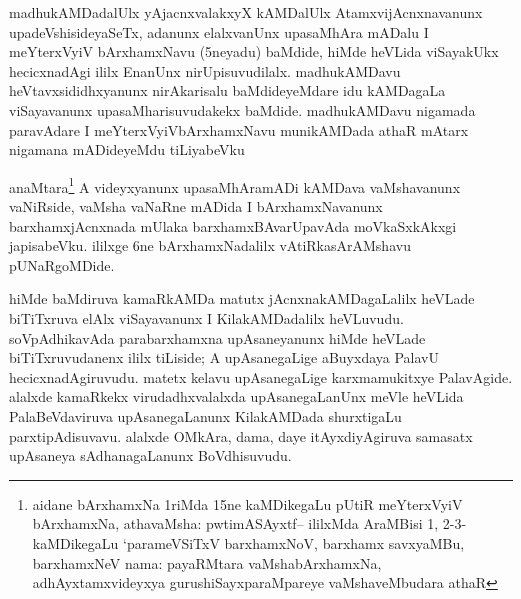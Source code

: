 
\begin{artha}
madhukAMDadalUlx yAjacnxvalakxyX kAMDalUlx AtamxvijAcnxnavanunx upadeVshisideyaSeTx, adanunx elalxvanUnx upasaMhAra mADalu I meYterxVyiV bArxhamxNavu (5neyadu) baMdide, hiMde heVLida viSayakUkx hecicxnadAgi ililx EnanUnx nirUpisuvudilalx. madhukAMDavu heVtavxsididhxyanunx nirAkarisalu baMdideyeMdare idu kAMDagaLa viSayavanunx upasaMharisuvudakekx baMdide. madhukAMDavu nigamada paravAdare I meYterxVyiVbArxhamxNavu munikAMDada athaR mAtarx nigamana mADideyeMdu tiLiyabeVku
\end{artha}

\begin{artha}
anaMtara\footnote{aidane bArxhamxNa 1riMda 15ne kaMDikegaLu pUtiR meYterxVyiV bArxhamxNa, athavaMsha: pwtimASAyxtf-- ililxMda AraMBisi 1, 2-3- kaMDikegaLu `parameVSiTxV barxhamxNoV, barxhamx savxyaMBu, barxhamxNeV nama: payaRMtara vaMshabArxhamxNa, adhAyxtamxvideyxya gurushiSayxparaMpareye vaMshaveMbudara athaR} A videyxyanunx upasaMhAramADi kAMDava vaMshavanunx vaNiRside, vaMsha vaNaRne mADida I bArxhamxNavanunx barxhamxjAcnxnada mUlaka barxhamxBAvarUpavAda moVkaSxkAkxgi japisabeVku. ililxge 6ne bArxhamxNadalilx vAtiRkasArAMshavu pUNaRgoMDide.
\end{artha}

\begin{artha}
hiMde baMdiruva kamaRkAMDa matutx jAcnxnakAMDagaLalilx heVLade biTiTxruva elAlx viSayavanunx I KilakAMDadalilx heVLuvudu. soVpAdhikavAda parabarxhamxna upAsaneyanunx hiMde heVLade biTiTxruvudanenx ililx tiLiside; A upAsanegaLige aBuyxdaya PalavU hecicxnadAgiruvudu. matetx kelavu upAsanegaLige karxmamukitxye PalavAgide. alalxde kamaRkekx virudadhxvalalxda upAsanegaLanUnx meVle heVLida PalaBeVdaviruva upAsanegaLanunx KilakAMDada shurxtigaLu parxtipAdisuvavu. alalxde OMkAra, dama, daye itAyxdiyAgiruva samasatx upAsaneya sAdhanagaLanunx BoVdhisuvudu.
\end{artha}

